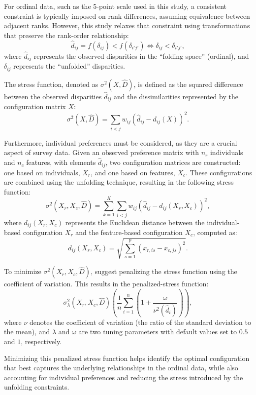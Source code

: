 For ordinal data, such as the 5-point scale used in this study, a consistent constraint is typically imposed on rank differences, assuming equivalence between adjacent ranks. However, this study relaxes that constraint using transformations that preserve the rank-order relationship:
\[
\hat{d}_{ij} = f(\delta_{ij}) < f(\delta_{i'j'}) \iff \delta_{ij} < \delta_{i'j'},
\]
where $\hat{d}_{ij}$ represents the observed disparities in the ``folding space'' (ordinal), and $\delta_{ij}$ represents the ``unfolded'' disparities.

The stress function, denoted as $\sigma^2(X, \hat{D})$, is defined as the squared difference between the observed disparities $\hat{d}_{ij}$ and the dissimilarities represented by the configuration matrix $X$:
\[
\sigma^2(X, \hat{D}) = \sum_{i<j} w_{ij} \left( \hat{d}_{ij} - d_{ij}(X) \right)^2.
\]

Furthermore, individual preferences must be considered, as they are a crucial aspect of survey data. Given an observed preference matrix with $n_r$ individuals and $n_c$ features, with elements $\hat{d}_{ij}$, two configuration matrices are constructed: one based on individuals, $X_r$, and one based on features, $X_c$. These configurations are combined using the unfolding technique, resulting in the following stress function:
\[
\sigma^2(X_r, X_c, \hat{D}) = \sum_{k=1}^K \sum_{i<j} w_{ij} \left( \hat{d}_{ij} - d_{ij}(X_r, X_c) \right)^2,
\]
where $d_{ij}(X_r, X_c)$ represents the Euclidean distance between the individual-based configuration $X_r$ and the feature-based configuration $X_c$, computed as:
\[
d_{ij}(X_r, X_c) = \sqrt{ \sum_{s=1}^{p} \left( x_{r, is} - x_{c, js} \right)^2 }.
\]

To minimize $\sigma^2(X_r, X_c, \hat{D})$, \citet{busing2005avoiding} suggest penalizing the stress function using the coefficient of variation. This results in the penalized-stress function:
\[
\sigma^2_\lambda (X_r, X_c, \hat{D}) \left( \frac{1}{n} \sum_{i=1}^{n} \left( 1 + \frac{\omega}{\nu^2(\hat{d}_i)} \right) \right),
\]
where $\nu$ denotes the coefficient of variation (the ratio of the standard deviation to the mean), and $\lambda$ and $\omega$ are two tuning parameters with default values set to $0.5$ and $1$, respectively.

Minimizing this penalized stress function helps identify the optimal configuration that best captures the underlying relationships in the ordinal data, while also accounting for individual preferences and reducing the stress introduced by the unfolding constraints.
